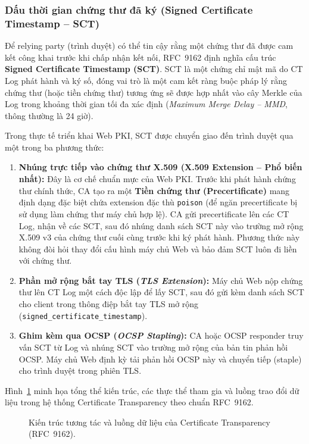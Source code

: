 \subsubsection{Dấu thời gian chứng thư đã ký (Signed Certificate Timestamp -- SCT)}
Để relying party (trình duyệt) có thể tin cậy rằng một chứng thư đã được cam kết công khai trước khi chấp nhận kết nối, RFC~9162 định nghĩa cấu trúc \textbf{Signed Certificate Timestamp (SCT)}. SCT là một chứng chỉ mật mã do CT Log phát hành và ký số, đóng vai trò là một cam kết ràng buộc pháp lý rằng chứng thư (hoặc tiền chứng thư) tương ứng sẽ được hợp nhất vào cây Merkle của Log trong khoảng thời gian tối đa xác định (\textit{Maximum Merge Delay -- MMD}, thông thường là 24 giờ).

Trong thực tế triển khai Web PKI, SCT được chuyển giao đến trình duyệt qua một trong ba phương thức:
\begin{enumerate}
    \item \textbf{Nhúng trực tiếp vào chứng thư X.509 (X.509 Extension -- Phổ biến nhất):} Đây là cơ chế chuẩn mực của Web PKI. Trước khi phát hành chứng thư chính thức, CA tạo ra một \textbf{Tiền chứng thư (Precertificate)} mang định dạng đặc biệt chứa extension đặc thù \texttt{poison} (để ngăn precertificate bị sử dụng làm chứng thư máy chủ hợp lệ). CA gửi precertificate lên các CT Log, nhận về các SCT, sau đó nhúng danh sách SCT này vào trường mở rộng X.509 v3 của chứng thư cuối cùng trước khi ký phát hành. Phương thức này không đòi hỏi thay đổi cấu hình máy chủ Web và bảo đảm SCT luôn đi liền với chứng thư.
    \item \textbf{Phần mở rộng bắt tay TLS (\textit{TLS Extension}):} Máy chủ Web nộp chứng thư lên CT Log một cách độc lập để lấy SCT, sau đó gửi kèm danh sách SCT cho client trong thông điệp bắt tay TLS mở rộng (\texttt{signed\_certificate\_timestamp}).
    \item \textbf{Ghim kèm qua OCSP (\textit{OCSP Stapling}):} CA hoặc OCSP responder truy vấn SCT từ Log và nhúng SCT vào trường mở rộng của bản tin phản hồi OCSP. Máy chủ Web định kỳ tải phản hồi OCSP này và chuyển tiếp (staple) cho trình duyệt trong phiên TLS.
\end{enumerate}

Hình~\ref{fig:ct-architecture} minh họa tổng thể kiến trúc, các thực thể tham gia và luồng trao đổi dữ liệu trong hệ thống Certificate Transparency theo chuẩn RFC~9162.

\begin{figure}[!htbp]
\centering

\caption{Kiến trúc tương tác và luồng dữ liệu của Certificate Transparency (RFC~9162).}
\label{fig:ct-architecture}
\end{figure}

